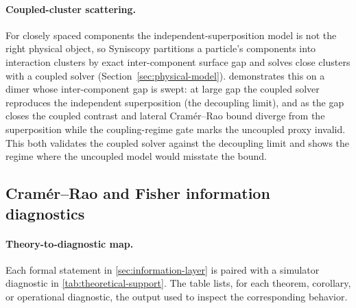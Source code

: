 \paragraph{Coupled-cluster scattering.} For closely spaced components the independent-superposition model is not the right physical object, so Syniscopy partitions a particle's components into interaction clusters by exact inter-component surface gap and solves close clusters with a coupled solver (Section~\ref{sec:physical-model}).  demonstrates this on a dimer whose inter-component gap is swept: at large gap the coupled solver reproduces the independent superposition (the decoupling limit), and as the gap closes the coupled contrast and lateral Cram\'{e}r--Rao bound diverge from the superposition while the coupling-regime gate marks the uncoupled proxy invalid. This both validates the coupled solver against the decoupling limit and shows the regime where the uncoupled model would misstate the bound.


\subsection{Cram\'{e}r--Rao and Fisher information diagnostics}

\paragraph{Theory-to-diagnostic map.}
Each formal statement in \cref{sec:information-layer} is paired with a simulator diagnostic in \cref{tab:theoretical-support}. The table lists, for each theorem, corollary, or operational diagnostic, the output used to inspect the corresponding behavior.

